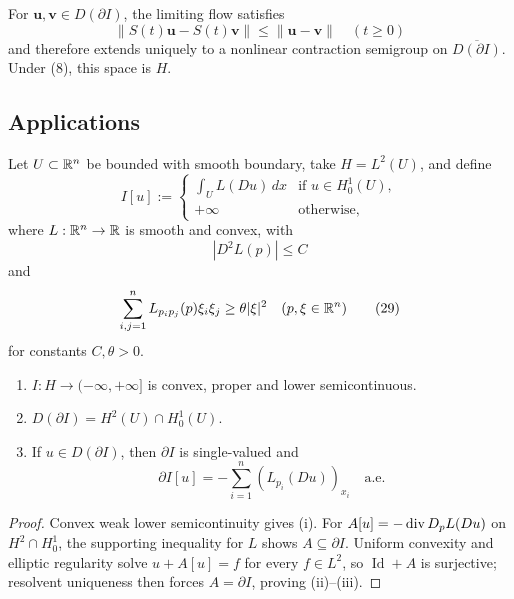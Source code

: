 \begin{remark}
\label{rem:gradient-flow-semigroup-extension}

For $\mathbf u,\mathbf v\in D(\partial I)$, the limiting flow satisfies
\[
\|S(t)\mathbf{u} - S(t)\mathbf{v}\| \leq \|\mathbf{u} - \mathbf{v}\| \quad (t \geq 0)
\]
and therefore extends uniquely to a nonlinear contraction semigroup on $\overline{D(\partial I)}$. Under (8), this space is $H$.
\end{remark}

\subsection{Applications}
\label{sec:gradient-flow-applications}

Let $U\subset\mathbb{R}^n$ be bounded with smooth boundary, take $H=L^2(U)$, and define
\[
I[u]:=
\begin{cases}
\displaystyle\int_U L(Du)\,dx & \text{if }u\in H_0^1(U),\\
+\infty & \text{otherwise},
\end{cases}
\tag{27}
\]
where $L:\mathbb{R}^n\to\mathbb{R}$ is smooth and convex, with
\[
|D^2L(p)|\leq C
\tag{28}
\]
and
\[
\sum_{i,j=1}^nL_{p_ip_j}(p)\xi_i\xi_j\geq\theta|\xi|^2
\quad(p,\xi\in\mathbb{R}^n)
\tag{29}
\]
for constants $C,\theta>0$.

\begin{theorem}
\label{thm:characterization-subdifferential-uniformly-convex-lagrangian}

\begin{enumerate}
\item[(i)] $I : H \to (-\infty, +\infty]$ is convex, proper and lower semicontinuous.
\item[(ii)] $D(\partial I) = H^2(U) \cap H_0^1(U)$.
\item[(iii)] If $u \in D(\partial I)$, then $\partial I$ is single-valued and
\[
\partial I[u] = -\sum_{i=1}^n (L_{p_i}(Du))_{x_i} \quad \text{a.e.}
\]
\end{enumerate}
\end{theorem}

\begin{proof}
\sketch Convex weak lower semicontinuity gives (i). For $A[u]=-\operatorname{div} D_pL(Du)$ on $H^2\cap H_0^1$, the supporting inequality for $L$ shows $A\subseteq\partial I$. Uniform convexity and elliptic regularity solve $u+A[u]=f$ for every $f\in L^2$, so $\operatorname{Id}+A$ is surjective; resolvent uniqueness then forces $A=\partial I$, proving (ii)--(iii).
\end{proof}

